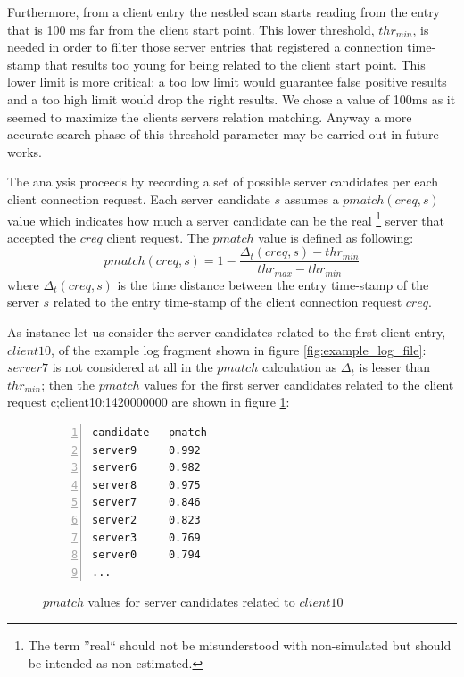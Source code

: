 Furthermore, from a client
entry the nestled scan starts reading from the entry that is 100 ms far
from the client start point. This lower threshold, $thr_{min}$, is needed in order to
 filter those server entries that registered a connection time-stamp
that results too young for being related to the client start point. This                        %
lower limit is more critical: a too low limit would guarantee false                             %
positive results and a too high limit would drop the right results.
We chose a value of 100ms as it seemed to maximize 
the clients servers relation matching. Anyway a more accurate search
phase of this threshold parameter may be carried out in future works.

The analysis proceeds by recording a set of possible server candidates 
 per each client connection request. Each server candidate $s$ assumes a                        %
$pmatch(creq,s)$ value which
indicates how much a server candidate can be the real
\footnote{The term ''real`` should not be misunderstood with
non-simulated but should be intended as non-estimated.}
 server that
accepted the $creq$
client request. The $pmatch$ value is defined
as following:
\begin{equation}
pmatch(creq, s) = 1 - \frac{\Delta_t(creq, s) - thr_{min}}{thr_{max} - thr_{min}}
\end{equation}
where $\Delta_t(creq, s)$ is the time distance between the entry
time-stamp of the server $s$ related to the entry time-stamp of the client connection request   %
$creq$.

As instance let us consider the server candidates related to the first
client entry, $client10$, of the example log
fragment shown in figure \ref{fig:example_log_file}: 
$server7$ is not considered at all in the $pmatch$ calculation  as
$\Delta_t$ 
is lesser than $thr_{min}$; then the $pmatch$ values for the first server
candidates related to the client request c;client10;1420000000 are shown in figure \ref{fig:pmatch}:
\begin{figure}[h]
\begin{lstlisting}[language=bash,frame=single, numbers=left]
candidate 	pmatch
server9 	0.992
server6 	0.982
server8 	0.975
server7  	0.846
server2  	0.823 
server3  	0.769
server0  	0.794
...
\end{lstlisting}
\caption{$pmatch$ values for server candidates related to $client10$}
\label{fig:pmatch}
\end{figure}

